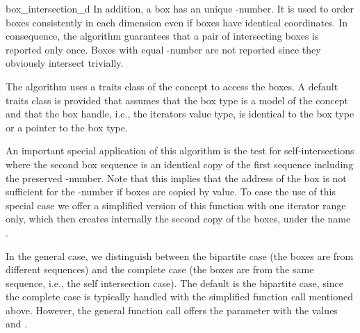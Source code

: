 \begin{ccRefFunction}{box_intersection_d}
In addition, a box has an unique -number. It is used to order
boxes consistently in each dimension even if boxes have identical
coordinates. In consequence, the algorithm guarantees that a pair of
intersecting boxes is reported only once. Boxes with equal
-number are not reported since they obviously intersect trivially.

The algorithm uses a traits class of the 
concept to access the boxes. A default traits class is provided that
assumes that the box type is a model of the 
concept and that the box handle, i.e., the iterators value type, is
identical to the box type or a pointer to the box type.

An important special application of this algorithm is the test for
self-intersections where the second box sequence is an identical copy
of the first sequence including the preserved -number. Note
that this implies that the address of the box is not sufficient for
the -number if boxes are copied by value. To ease the use of
this special case we offer a simplified version of this function with
one iterator range only, which then creates internally the second copy
of the boxes, under the name .

In the general case, we distinguish between the bipartite case (the
boxes are from different sequences) and the complete case (the boxes
are from the same sequence, i.e., the self intersection case). The
default is the bipartite case, since the complete case is typically
handled with the simplified function call mentioned above. However,
the general function call offers the  parameter with the
values  and
.


 

\end{ccRefFunction}
